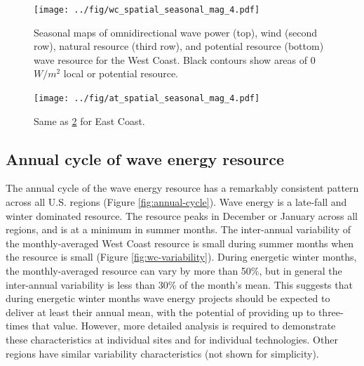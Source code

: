 
\begin{figure}[ht]
  \centering
  \texttt{[image: ../fig/wc\_spatial\_seasonal\_mag\_4.pdf]}
  \caption{Seasonal maps of omnidirectional wave power (top), wind (second row), natural resource (third row), and potential resource (bottom) wave resource for the West Coast. Black contours show areas of 0 $W/m^{2}$ local or potential resource.}
  \label{fig:maps-wc}
\end{figure}

\begin{figure}[ht]
  \centering
  \texttt{[image: ../fig/at\_spatial\_seasonal\_mag\_4.pdf]}
  \caption{Same as \ref{fig:maps-at} for East Coast.}
  \label{fig:maps-at}
\end{figure}

\subsection{Annual cycle of wave energy resource}

The annual cycle of the wave energy resource has a remarkably consistent pattern across all U.S. regions (Figure \ref{fig:annual-cycle}). Wave energy is a late-fall and winter dominated resource. The resource peaks in December or January across all regions, and is at a minimum in summer months. The inter-annual variability of the monthly-averaged West Coast resource is small during summer months when the resource is small (Figure \ref{fig:wc-variability}). During energetic winter months, the monthly-averaged resource can vary by more than 50\%, but in general the inter-annual variability is less than 30\% of the month's mean. This suggests that during energetic winter months wave energy projects should be expected to deliver at least their annual mean, with the potential of providing up to three-times that value.  However, more detailed analysis is required to demonstrate these characteristics at individual sites and for individual technologies. Other regions have similar variability characteristics (not shown for simplicity).

